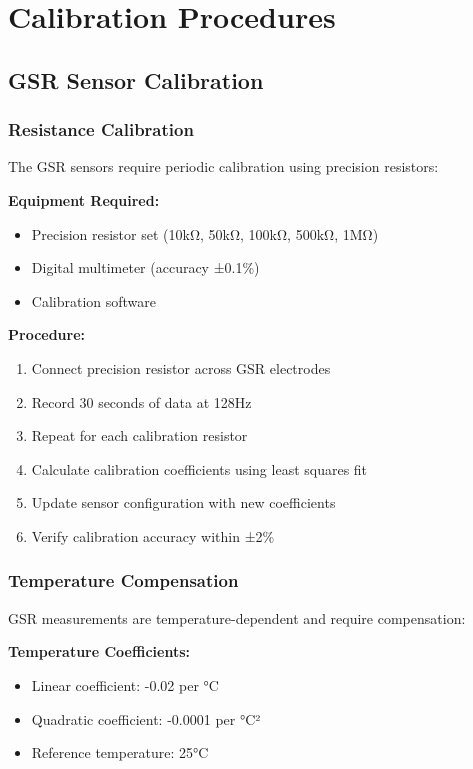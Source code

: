 \section{Calibration Procedures}

\subsection{GSR Sensor Calibration}

\subsubsection{Resistance Calibration}

The GSR sensors require periodic calibration using precision resistors:

\textbf{Equipment Required:}
\begin{itemize}
\item Precision resistor set (10kΩ, 50kΩ, 100kΩ, 500kΩ, 1MΩ)
\item Digital multimeter (accuracy ±0.1\%)
\item Calibration software
\end{itemize}

\textbf{Procedure:}
\begin{enumerate}
\item Connect precision resistor across GSR electrodes
\item Record 30 seconds of data at 128Hz
\item Repeat for each calibration resistor
\item Calculate calibration coefficients using least squares fit
\item Update sensor configuration with new coefficients
\item Verify calibration accuracy within ±2\%
\end{enumerate}

\subsubsection{Temperature Compensation}

GSR measurements are temperature-dependent and require compensation:

\textbf{Temperature Coefficients:}
\begin{itemize}
\item Linear coefficient: -0.02 per °C
\item Quadratic coefficient: -0.0001 per °C²
\item Reference temperature: 25°C
\end{itemize}

